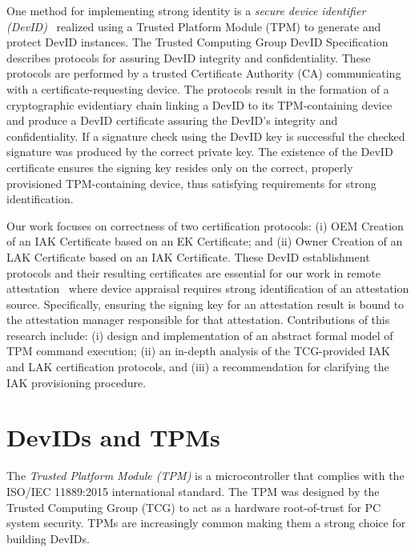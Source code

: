 \documentclass[runningheads]{llncs}
\begin{document}
One method for implementing strong identity is a \emph{secure device
  identifier (DevID)}~\citep{DevIDSpec-IEEE} realized using a Trusted
Platform Module (TPM) to generate and protect DevID instances.  The
Trusted Computing Group DevID Specification~\citep{DevIDSpec-TCG}
describes protocols for assuring DevID integrity and
confidentiality. These protocols are performed by a trusted
Certificate Authority (CA) communicating with a certificate-requesting
device.  The protocols result in the formation of a cryptographic
evidentiary chain linking a DevID to its TPM-containing device and
produce a DevID certificate assuring the DevID's integrity and
confidentiality. If a signature check using the DevID key is
successful the checked signature was produced by the correct private
key.  The existence of the DevID certificate ensures the signing key
resides only on the correct, properly provisioned TPM-containing
device, thus satisfying requirements for strong identification.


Our work focuses on correctness of two certification protocols:
(i) OEM Creation of an IAK Certificate based on an EK Certificate; and
(ii) Owner Creation of an LAK Certificate based on an IAK
Certificate. These DevID establishment protocols and their resulting
certificates are essential for our work in remote
attestation~\citep{Coker::Principles-of-R,petz2022innovations} where
device appraisal requires strong identification of an attestation
source. Specifically, ensuring the signing key for an attestation
result is bound to the attestation manager responsible for that
attestation.  Contributions of this research include: (i) design and
implementation of an abstract formal model of TPM command execution;
(ii) an in-depth analysis of the TCG-provided IAK and LAK
certification protocols, and (iii) a recommendation for clarifying the
IAK provisioning procedure.

\section{DevIDs and TPMs}
The \emph{Trusted Platform Module (TPM)} is a microcontroller that complies
with the ISO/IEC 11889:2015 international standard.  The TPM was
designed by the Trusted Computing Group (TCG) to act as a hardware
root-of-trust for PC system security.  TPMs are increasingly common
making them a strong choice for building DevIDs.
\end{document}
